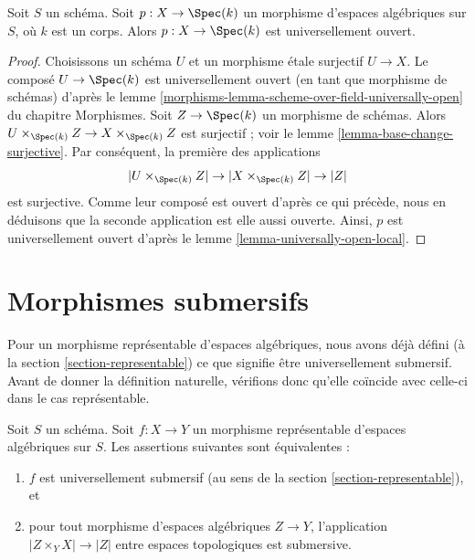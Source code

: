 \begin{lemma}
\label{lemma-space-over-field-universally-open}
Soit $S$ un schéma. Soit $p : X \to \Spec(k)$ un morphisme
d'espaces algébriques sur $S$, où $k$ est un corps. Alors
$p : X \to \Spec(k)$ est universellement ouvert.
\end{lemma}

\begin{proof}
Choisissons un schéma $U$ et un morphisme \'etale surjectif $U \to X$.
Le composé $U \to \Spec(k)$ est universellement ouvert (en tant que morphisme
de schémas) d'après le
lemme \ref{morphisms-lemma-scheme-over-field-universally-open} du chapitre Morphismes.
Soit $Z \to \Spec(k)$ un morphisme de schémas. Alors
$U \times_{\Spec(k)} Z \to X \times_{\Spec(k)} Z$ est surjectif ;
voir le
lemme \ref{lemma-base-change-surjective}.
Par conséquent, la première des applications
$$
|U \times_{\Spec(k)} Z| \to |X \times_{\Spec(k)} Z| \to |Z|
$$
est surjective. Comme leur composé est ouvert d'après ce qui précède, nous en déduisons que
la seconde application est elle aussi ouverte. Ainsi, $p$ est universellement ouvert d'après le
lemme \ref{lemma-universally-open-local}.
\end{proof}








\section{Morphismes submersifs}
\label{section-submersive}

\noindent
Pour un morphisme représentable d'espaces algébriques, nous avons déjà défini (à la
section \ref{section-representable})
ce que signifie être universellement submersif. Avant de donner la définition
naturelle, vérifions donc qu'elle coïncide avec celle-ci dans le cas représentable.

\begin{lemma}
\label{lemma-characterize-representable-universally-submersive}
Soit $S$ un schéma. Soit $f : X \to Y$ un morphisme représentable
d'espaces algébriques sur $S$. Les assertions suivantes sont équivalentes :
\begin{enumerate}
\item $f$ est universellement submersif
(au sens de la section \ref{section-representable}), et
\item pour tout morphisme d'espaces algébriques $Z \to Y$, l'application
$|Z \times_Y X| \to |Z|$ entre espaces topologiques est submersive.
\end{enumerate}
\end{lemma}

